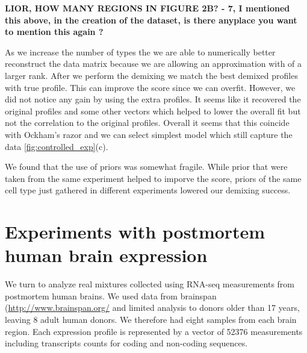 {\bf{LIOR, HOW MANY REGIONS IN FIGURE 2B?        - 7, I mentioned this above, in the creation of the dataset, is there anyplace you want to mention this again ?}}


As we increase the number of types the we are able to numerically better reconstruct the data matrix because we are allowing an approximation with of a larger rank. After we perform the demixing we match the best demixed profiles with true profile. This can improve the score since we can overfit. However, we did not notice any gain by using the extra profiles. It seems like it recovered the original profiles and some other vectors which helped to lower the overall fit but not the correlation to the original profiles. Overall it seems that this coincide with Ockham's razor and we can select simplest model which still capture the data \ref{fig:controlled_exp}(c). 


We found that the use of priors was somewhat fragile. While prior that were taken from the same experiment helped to imporve the score, priors of the same cell type just gathered in different experiments lowered our demixing success. 


\section{Experiments with postmortem human brain expression}
\label{Human_exp}

We turn to analyze real mixtures collected using RNA-seq measurements from postmortem human brains. We used data from brainspan \cite{brainspan} (\url{http://www.brainspan.org/} and limited analysis to donors older than 17 years, leaving 8 adult human donors. We therefore had eight samples from each brain region. Each expression profile is represented by a vector of 52376 measurements including transcripts counts for coding and non-coding sequences. 


